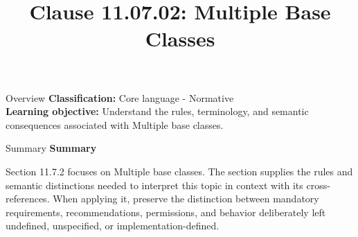 \documentclass[10pt,letterpaper]{article}
\title{Clause 11.07.02: Multiple Base Classes}
\author{}
\date{}
\begin{document}
\maketitle
\begin{CornellOverviewBox}{Overview}
\textbf{Classification:} Core language - Normative\\[2pt]
\textbf{Learning objective:} Understand the rules, terminology, and semantic consequences associated with Multiple base classes.
\end{CornellOverviewBox}\begin{CornellSummaryBox}{Summary}
{\sffamily\bfseries\color{Accent} Summary}\par\vspace{3pt}Section 11.7.2 focuses on Multiple base classes. The section supplies the rules and semantic distinctions needed to interpret this topic in context with its cross-references. When applying it, preserve the distinction between mandatory requirements, recommendations, permissions, and behavior deliberately left undefined, unspecified, or implementation-defined.
\end{CornellSummaryBox}
\end{document}

